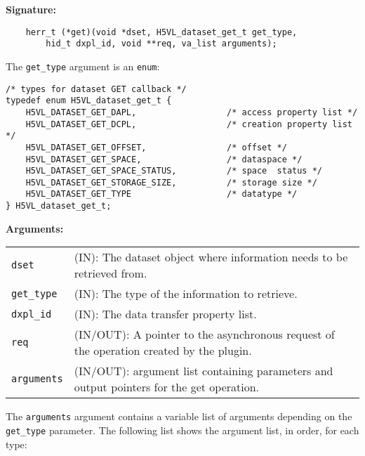 \begin{mdframed}[style=bgbox]
\textbf{Signature:}
\begin{lstlisting}
    herr_t (*get)(void *dset, H5VL_dataset_get_t get_type, 
        hid_t dxpl_id, void **req, va_list arguments);
\end{lstlisting}

The \texttt{get\_type} argument is an \texttt{enum}:
\begin{lstlisting}
/* types for dataset GET callback */
typedef enum H5VL_dataset_get_t {
    H5VL_DATASET_GET_DAPL,                  /* access property list */
    H5VL_DATASET_GET_DCPL,                  /* creation property list */
    H5VL_DATASET_GET_OFFSET,                /* offset */
    H5VL_DATASET_GET_SPACE,                 /* dataspace */
    H5VL_DATASET_GET_SPACE_STATUS,          /* space  status */
    H5VL_DATASET_GET_STORAGE_SIZE,          /* storage size */
    H5VL_DATASET_GET_TYPE                   /* datatype */
} H5VL_dataset_get_t;
\end{lstlisting}

\textbf{Arguments:}\\
\begin{tabular}{l p{10cm}}
  \texttt{dset} & (IN): The dataset object where information needs to be
  retrieved from.\\
  \texttt{get\_type} & (IN): The type of the information to retrieve.\\
  \texttt{dxpl\_id} & (IN): The data transfer property list.\\
  \texttt{req} & (IN/OUT): A pointer to the asynchronous request of the
  operation created by the plugin.\\
  \texttt{arguments} & (IN/OUT): argument list containing parameters and
  output pointers for the get operation. \\
\end{tabular}
\end{mdframed}

The \texttt{arguments} argument contains a variable list of arguments
depending on the \texttt{get\_type} parameter. The following list shows
the argument list, in order, for each type:

